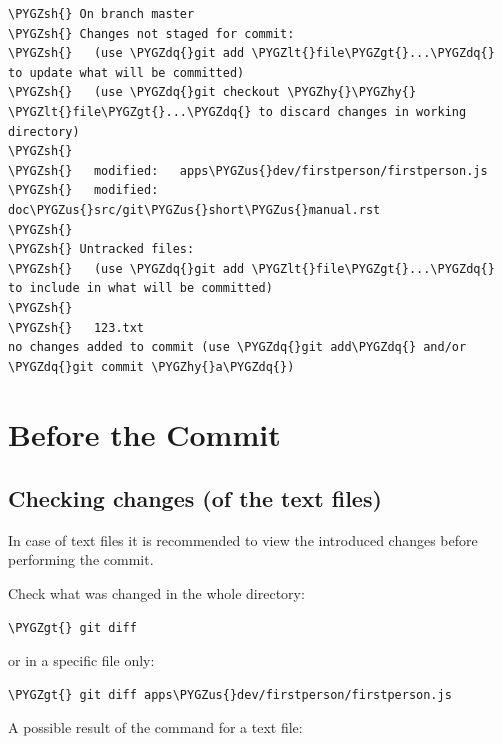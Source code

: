 \documentclass[a4paper,12pt,oneside]{sphinxmanual}
\def\PYGZus{\char`\_}
\def\PYGZlt{\char`\<}
\def\PYGZgt{\char`\>}
\def\PYGZsh{\char`\#}
\def\PYGZhy{\char`\-}
\def\PYGZdq{\char`\"}
\begin{document}
\begin{Verbatim}[commandchars=\\\{\}]
\PYGZsh{} On branch master
\PYGZsh{} Changes not staged for commit:
\PYGZsh{}   (use \PYGZdq{}git add \PYGZlt{}file\PYGZgt{}...\PYGZdq{} to update what will be committed)
\PYGZsh{}   (use \PYGZdq{}git checkout \PYGZhy{}\PYGZhy{} \PYGZlt{}file\PYGZgt{}...\PYGZdq{} to discard changes in working directory)
\PYGZsh{}
\PYGZsh{}   modified:   apps\PYGZus{}dev/firstperson/firstperson.js
\PYGZsh{}   modified:   doc\PYGZus{}src/git\PYGZus{}short\PYGZus{}manual.rst
\PYGZsh{}
\PYGZsh{} Untracked files:
\PYGZsh{}   (use \PYGZdq{}git add \PYGZlt{}file\PYGZgt{}...\PYGZdq{} to include in what will be committed)
\PYGZsh{}
\PYGZsh{}   123.txt
no changes added to commit (use \PYGZdq{}git add\PYGZdq{} and/or \PYGZdq{}git commit \PYGZhy{}a\PYGZdq{})
\end{Verbatim}


\section{Before the Commit}
\label{git_short_manual:id5}\label{git_short_manual:git-example-prepare-to-commit}\label{git_short_manual:index-3}

\subsection{Checking changes (of the text files)}
\label{git_short_manual:id6}
In case of text files it is recommended to view the introduced changes before performing the commit.

Check what was changed in the whole directory:

\begin{Verbatim}[commandchars=\\\{\}]
\PYGZgt{} git diff
\end{Verbatim}

or in a specific file only:

\begin{Verbatim}[commandchars=\\\{\}]
\PYGZgt{} git diff apps\PYGZus{}dev/firstperson/firstperson.js
\end{Verbatim}

A possible result of the  command for a text file:
\end{document}
